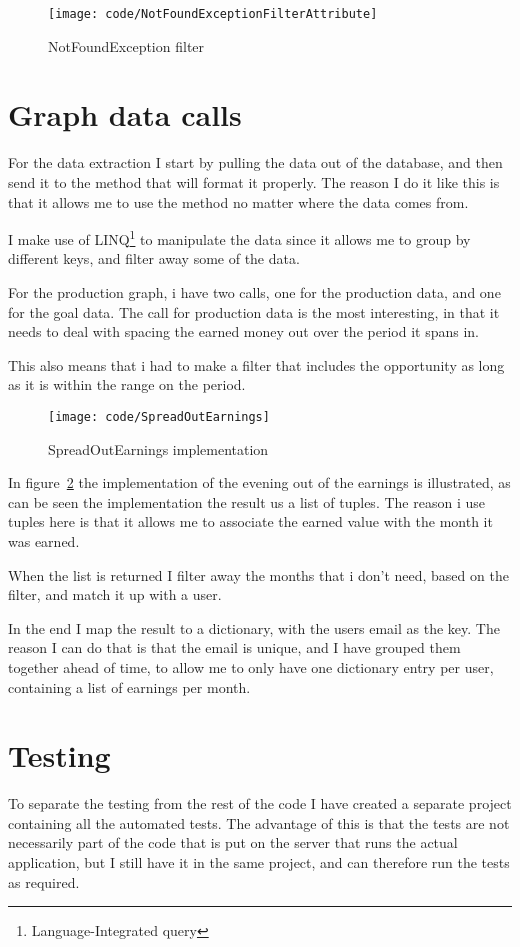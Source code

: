 \begin{figure}
  \texttt{[image: code/NotFoundExceptionFilterAttribute]}
  \caption{NotFoundException filter}
  \label{fig:notfoundfilter}
\end{figure}

\section{Graph data calls}
\label{sec:Graph data calls}
For the data extraction I start by pulling the data out of the database, and
then send it to the method that will format it properly. The reason I do it like
this is that it allows me to use the method no matter where the data comes from. 

I make use of LINQ\footnote{Language-Integrated query} to manipulate the data
since it allows me to group by different keys, and filter away some of the data.

For the production graph, i have two calls, one for the production data, and one
for the goal data. The call for production data is the most interesting, in that
it needs to deal with spacing the earned money out over the period it spans in.

This also means that i had to make a filter that includes the opportunity as
long as it is within the range on the period.

\begin{figure}
  \texttt{[image: code/SpreadOutEarnings]}
  \caption{SpreadOutEarnings implementation}
  \label{fig:spreadoutearnings}
\end{figure}

In figure~\ref{fig:spreadoutearnings} the implementation of the evening out of
the earnings is illustrated, as can be seen the implementation the result us a
list of tuples. The reason i use tuples here is that it allows me to associate
the earned value with the month it was earned.

When the list is returned I filter away the months that i don't need, based on
the filter, and match it up with a user.

In the end I map the result to a dictionary, with the users email as the key.
The reason I can do that is that the email is unique, and I have grouped them
together ahead of time, to allow me to only have one dictionary entry per user,
containing a list of earnings per month.

\section{Testing}
To separate the testing from the rest of the code I have created a separate
project containing all the automated tests. The advantage of this is that the
tests are not necessarily part of the code that is put on the server that runs
the actual application, but I still have it in the same project, and can
therefore run the tests as required.


